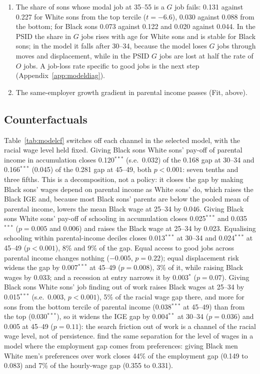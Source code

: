 \begin{enumerate}[leftmargin=*, itemsep=0pt]
White gradient at the bottom is flatter at entry.
\item The share of sons whose modal job at 35--55 is a $G$ job fails: 0.131 against 0.227 for White sons from the top
tercile ($t = -6.6$), 0.030 against 0.088 from the bottom; for Black sons 0.073 against 0.122 and 0.020 against 0.044.
In the PSID the share in $G$ jobs rises with age for White sons and is stable for Black sons; in the model it falls
after 30--34, because the model loses $G$ jobs through moves and displacement, while in the PSID $G$ jobs are lost at
half the rate of $O$ jobs. A job-loss rate specific to good jobs is the next step (Appendix~\ref{app:modeldiag}).
\item The same-employer growth gradient in parental income passes (Fit, above).
\end{enumerate}

\subsection{Counterfactuals}



Table~\ref{tab:modelcf} switches off each channel in the selected model, with the racial wage level held fixed. Giving
Black sons White sons' pay-off of parental income in accumulation closes 0.120$^{***}$ (s.e.\ 0.032) of the 0.168 gap at
30--34 and 0.166$^{***}$ (0.045) of the 0.281 gap at 45--49, both $p < 0.001$: seven tenths and three fifths. This is
a decomposition, not a policy: it closes the gap by making Black sons' wages depend on parental income as White sons'
do, which raises the Black IGE and, because most Black sons' parents are below the pooled mean of parental income, lowers
the mean Black wage at 25--34 by 0.046. Giving Black sons White sons' pay-off of schooling in accumulation closes
0.025$^{***}$ and 0.035$^{***}$ ($p = 0.005$ and 0.006) and raises the Black wage at 25--34 by 0.023. Equalising
schooling within parental-income deciles closes 0.013$^{***}$ at 30--34 and 0.024$^{***}$ at 45--49 ($p < 0.001$), 8\%
and 9\% of the gap. Equal access to good jobs across parental income changes nothing ($-0.005$, $p = 0.22$); equal
displacement risk widens the gap by 0.007$^{***}$ at 45--49 ($p = 0.008$), 3\% of it, while raising Black wages by
0.033; and a recession at entry narrows it by 0.003$^{*}$ ($p = 0.07$). Giving Black sons White sons' job finding out
of work raises Black wages at 25--34 by 0.015$^{***}$ (s.e.\ 0.003, $p < 0.001$), 5\% of the racial wage gap there,
and more for sons from the bottom tercile of parental income (0.038$^{***}$ at 45--49) than from the top
(0.030$^{***}$), so it widens the IGE gap by 0.004$^{**}$ at 30--34 ($p = 0.036$) and 0.005 at 45--49 ($p = 0.11$):
the search friction out of work is a channel of the racial wage level, not of persistence. \citet{rauh2023black} find
the same separation for the level of wages in a model where the employment gap comes from preferences: giving Black men
White men's preferences over work closes 44\% of the employment gap (0.149 to 0.083) and 7\% of the hourly-wage gap
(0.355 to 0.331).

